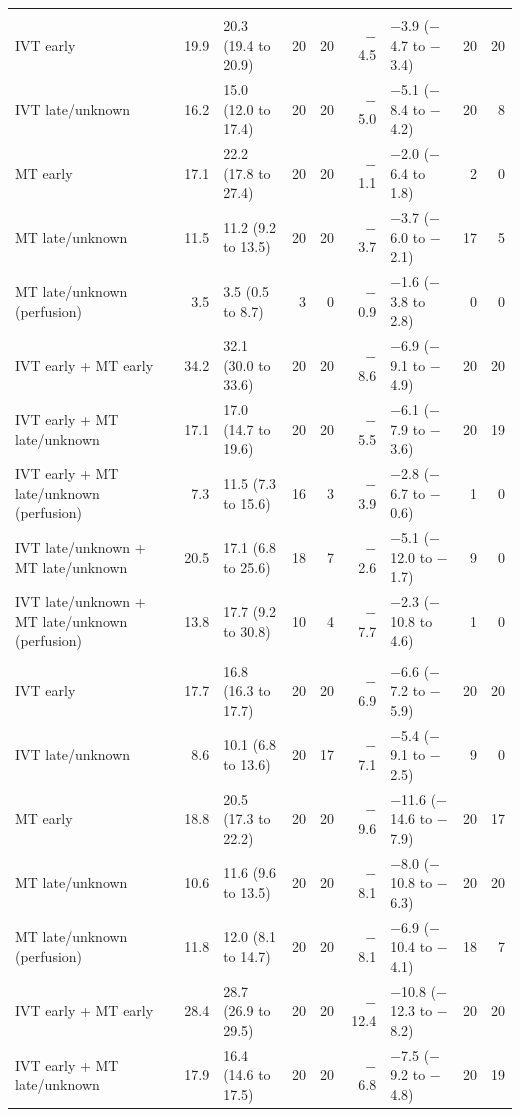 {\begin{longtable}{p{4.3cm}rlrrrlrr}
\addlinespace
\multicolumn{9}{l}{\textbf{NIHSS 11--15}}\\
IVT early & 19.9 & 20.3 (19.4 to 20.9) & 20 & 20 & $-$4.5 & $-$3.9 ($-$4.7 to $-$3.4) & 20 & 20 \\
IVT late/unknown & 16.2 & 15.0 (12.0 to 17.4) & 20 & 20 & $-$5.0 & $-$5.1 ($-$8.4 to $-$4.2) & 20 & 8 \\
MT early & 17.1 & 22.2 (17.8 to 27.4) & 20 & 20 & $-$1.1 & $-$2.0 ($-$6.4 to 1.8) & 2 & 0 \\
MT late/unknown & 11.5 & 11.2 (9.2 to 13.5) & 20 & 20 & $-$3.7 & $-$3.7 ($-$6.0 to $-$2.1) & 17 & 5 \\
MT late/unknown (perfusion) & 3.5 & 3.5 (0.5 to 8.7) & 3 & 0 & $-$0.9 & $-$1.6 ($-$3.8 to 2.8) & 0 & 0 \\
IVT early + MT early & 34.2 & 32.1 (30.0 to 33.6) & 20 & 20 & $-$8.6 & $-$6.9 ($-$9.1 to $-$4.9) & 20 & 20 \\
IVT early + MT late/unknown & 17.1 & 17.0 (14.7 to 19.6) & 20 & 20 & $-$5.5 & $-$6.1 ($-$7.9 to $-$3.6) & 20 & 19 \\
IVT early + MT late/unknown (perfusion) & 7.3 & 11.5 (7.3 to 15.6) & 16 & 3 & $-$3.9 & $-$2.8 ($-$6.7 to $-$0.6) & 1 & 0 \\
IVT late/unknown + MT late/unknown & 20.5 & 17.1 (6.8 to 25.6) & 18 & 7 & $-$2.6 & $-$5.1 ($-$12.0 to $-$1.7) & 9 & 0 \\
IVT late/unknown + MT late/unknown (perfusion) & 13.8 & 17.7 (9.2 to 30.8) & 10 & 4 & $-$7.7 & $-$2.3 ($-$10.8 to 4.6) & 1 & 0 \\
\addlinespace
\multicolumn{9}{l}{\textbf{NIHSS 16--20}}\\
IVT early & 17.7 & 16.8 (16.3 to 17.7) & 20 & 20 & $-$6.9 & $-$6.6 ($-$7.2 to $-$5.9) & 20 & 20 \\
IVT late/unknown & 8.6 & 10.1 (6.8 to 13.6) & 20 & 17 & $-$7.1 & $-$5.4 ($-$9.1 to $-$2.5) & 9 & 0 \\
MT early & 18.8 & 20.5 (17.3 to 22.2) & 20 & 20 & $-$9.6 & $-$11.6 ($-$14.6 to $-$7.9) & 20 & 17 \\
MT late/unknown & 10.6 & 11.6 (9.6 to 13.5) & 20 & 20 & $-$8.1 & $-$8.0 ($-$10.8 to $-$6.3) & 20 & 20 \\
MT late/unknown (perfusion) & 11.8 & 12.0 (8.1 to 14.7) & 20 & 20 & $-$8.1 & $-$6.9 ($-$10.4 to $-$4.1) & 18 & 7 \\
IVT early + MT early & 28.4 & 28.7 (26.9 to 29.5) & 20 & 20 & $-$12.4 & $-$10.8 ($-$12.3 to $-$8.2) & 20 & 20 \\
IVT early + MT late/unknown & 17.9 & 16.4 (14.6 to 17.5) & 20 & 20 & $-$6.8 & $-$7.5 ($-$9.2 to $-$4.8) & 20 & 19 \\

\end{longtable}}
